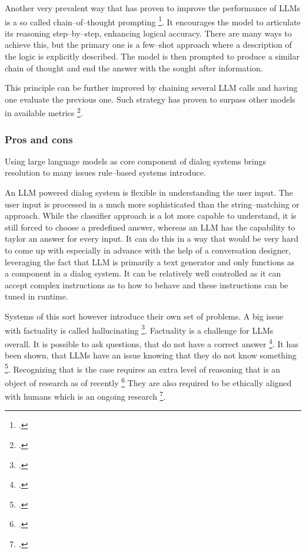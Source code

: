 \documentclass[12pt]{report}
\begin{document}
{Another very prevalent way that has proven to
improve the performance of LLMs is a so called
chain–of–thought prompting \footcite{wei2022chain}.
It encourages the model to
articulate its reasoning step–by–step,
enhancing logical accuracy.
There are many ways to achieve this,
but the primary one is a few–shot approach
where a description of the logic is
explicitly described.
The model is then prompted to produce
a similar chain of thought
and end the answer with the sought after information.

This principle can be further improved by
chaining several LLM calls and having one
evaluate the previous one.
Such strategy has proven to surpass other models
in available metrics \footcite{wu2024comparative}.

\subsubsection{Pros and cons}

Using large language models as core component
of dialog systems brings resolution to many issues
rule–based systems introduce.

An LLM powered dialog system is flexible in understanding
the user input.
The user input is processed in a much more sophisticated
than the string–matching or approach.
While the classifier approach is a lot more capable to understand,
it is still forced to choose a predefined answer, whereas
an LLM has the capability to taylor an answer for every input.
It can do this in a way that would be very hard to come up with
especially in advance with the help of a conversation designer,
leveraging the fact that LLM is primarily a text generator
and only functions as a component in a dialog system.
It can be relatively well controlled as
it can accept complex instructions as to how to behave
and these instructions can be tuned in runtime.

Systems of this sort however introduce their own set of problems.
A big issue with factuality is called hallucinating \footcite{bruno2023insights, perkovic2024hallucinations}.
Factuality is a challenge for LLMs overall.
It is possible to ask questions,
that do not have a correct answer \footcite{payandeh2023susceptible}.
It has been shown, that LLMs have an issue
knowing that they do not know something \footcite{yin2023large}.
Recognizing that is the case requires
an extra level of reasoning
that is an object of research as of recently \footcite{transformer_circuits_2024}
They are also required to be ethically aligned with humans which is an ongoing research \footcite{wang2024comprehensive}.

}
\end{document}
